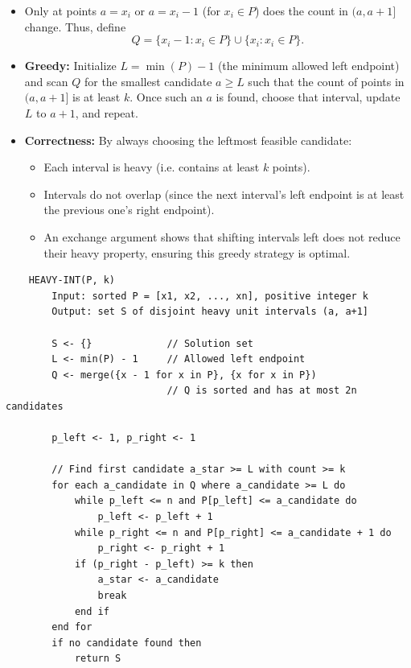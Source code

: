 \documentclass[letterpaper, 11pt]{article}
\newcommand{\1}{\mathds{1}}	%
\theoremstyle{definition}
\newenvironment{solution}{{\par\noindent\it Solution.}}{}
\begin{document}
\begin{solution}
    \begin{itemize}
        \item  Only at points \(a = x_i\) or \(a = x_i-1\) (for \(x_i\in P\)) does the count in \((a,a+1]\) change. Thus, define
        \[
        Q = \{x_i-1 : x_i \in P\} \cup \{x_i : x_i \in P\}.
        \]
        \item \textbf{Greedy:} Initialize \(L=\min(P)-1\) (the minimum allowed left endpoint) and scan \(Q\) for the smallest candidate \(a \ge L\) such that the count of points in \((a, a+1]\) is at least \(k\). Once such an \(a\) is found, choose that interval, update \(L\) to \(a+1\), and repeat.
        \item \textbf{Correctness:} By always choosing the leftmost feasible candidate:
        \begin{itemize}
            \item Each interval is heavy (i.e. contains at least \(k\) points).
            \item Intervals do not overlap (since the next interval's left endpoint is at least the previous one's right endpoint).
            \item An exchange argument shows that shifting intervals left does not reduce their heavy property, ensuring this greedy strategy is optimal.
        \end{itemize}
    \end{itemize}
    
    \begin{lstlisting}
    HEAVY-INT(P, k)
        Input: sorted P = [x1, x2, ..., xn], positive integer k
        Output: set S of disjoint heavy unit intervals (a, a+1]
    
        S <- {}             // Solution set
        L <- min(P) - 1     // Allowed left endpoint
        Q <- merge({x - 1 for x in P}, {x for x in P})
                            // Q is sorted and has at most 2n candidates
    
        p_left <- 1, p_right <- 1
    
        // Find first candidate a_star >= L with count >= k
        for each a_candidate in Q where a_candidate >= L do
            while p_left <= n and P[p_left] <= a_candidate do
                p_left <- p_left + 1
            while p_right <= n and P[p_right] <= a_candidate + 1 do
                p_right <- p_right + 1
            if (p_right - p_left) >= k then
                a_star <- a_candidate
                break
            end if
        end for
        if no candidate found then
            return S
    

\end{lstlisting}
\end{solution}
\end{document}
